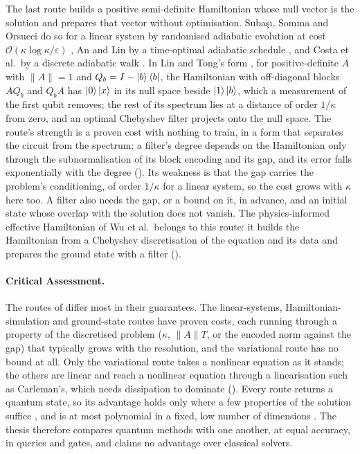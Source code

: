 The last route builds a positive semi-definite Hamiltonian whose null vector is the solution and prepares that vector without optimisation. Subaşı, Somma and Orsucci do so for a linear system by randomised adiabatic evolution at cost $\mathcal O(\kappa\log\kappa/\varepsilon)$ \cite{subasi2019adiabatic}, An and Lin by a time-optimal adiabatic schedule \cite{anlin2022timeoptimal}, and Costa et al.\ by a discrete adiabatic walk \cite{costa2022optimal}. In Lin and Tong's form \cite{lintong2020filtering}, for positive-definite $A$ with $\|A\|=1$ and $Q_b=I-\ket{b}\bra{b}$, the Hamiltonian with off-diagonal blocks $AQ_b$ and $Q_bA$ has $\ket{0}\ket{x}$ in its null space beside $\ket{1}\ket{b}$, which a measurement of the first qubit removes; the rest of its spectrum lies at a distance of order $1/\kappa$ from zero, and an optimal Chebyshev filter projects onto the null space. The route's strength is a proven cost with nothing to train, in a form that separates the circuit from the spectrum: a filter's degree depends on the Hamiltonian only through the subnormalisation of its block encoding and its gap, and its error falls exponentially with the degree (). Its weakness is that the gap carries the problem's conditioning, of order $1/\kappa$ for a linear system, so the cost grows with $\kappa$ here too. A filter also needs the gap, or a bound on it, in advance, and an initial state whose overlap with the solution does not vanish. The physics-informed effective Hamiltonian of Wu et al.\ belongs to this route: it builds the Hamiltonian from a Chebyshev discretisation of the equation and its data and prepares the ground state with a filter ().

\paragraph{Critical Assessment.}
\label{sec:bg-de-assessment}

The routes of  differ most in their guarantees. The linear-systems, Hamiltonian-simulation and ground-state routes have proven costs, each running through a property of the discretised problem ($\kappa$, $\|A\|T$, or the encoded norm against the gap) that typically grows with the resolution, and the variational route has no bound at all. Only the variational route takes a nonlinear equation as it stands; the others are linear and reach a nonlinear equation through a linearisation such as Carleman's, which needs dissipation to dominate (). Every route returns a quantum state, so its advantage holds only where a few properties of the solution suffice \cite{aaronson2015fineprint,williams2024readout}, and is at most polynomial in a fixed, low number of dimensions \cite{montanaro2016fem}. The thesis therefore compares quantum methods with one another, at equal accuracy, in queries and gates, and claims no advantage over classical solvers.

